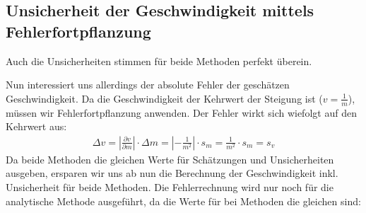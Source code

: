 \documentclass[letterpaper,10pt,english]{jupyterBook}
\begin{document}
\subsection{Unsicherheit der Geschwindigkeit mittels Fehlerfortpflanzung}
\label{\detokenize{content/T_Fehlerfortpflanzung:unsicherheit-der-geschwindigkeit-mittels-fehlerfortpflanzung}}
\sphinxAtStartPar
Auch die Unsicherheiten stimmen für beide Methoden perfekt überein.

\sphinxAtStartPar
Nun interessiert uns allerdings der absolute Fehler der geschätzen Geschwindigkeit. Da die Geschwindigkeit der Kehrwert der Steigung ist (\(v = \frac{1}{m}\)), müssen wir Fehlerfortpflanzung anwenden. Der Fehler wirkt sich wiefolgt auf den Kehrwert aus:
\begin{equation*}
\begin{split}\Delta v = \left|\frac{\partial v}{\partial m}\right|\cdot \Delta m = \left| -\frac{1}{m^2} \right| \cdot s_m = \frac{1}{m^2} \cdot s_m = s_v\end{split}
\end{equation*}
\sphinxAtStartPar
Da beide Methoden die gleichen Werte für Schätzungen und Unsicherheiten ausgeben, ersparen wir uns ab nun die Berechnung der Geschwindigkeit inkl. Unsicherheit für beide Methoden. Die Fehlerrechnung wird nur noch für die analytische Methode ausgeführt, da die Werte für bei Methoden die gleichen sind:
\end{document}
